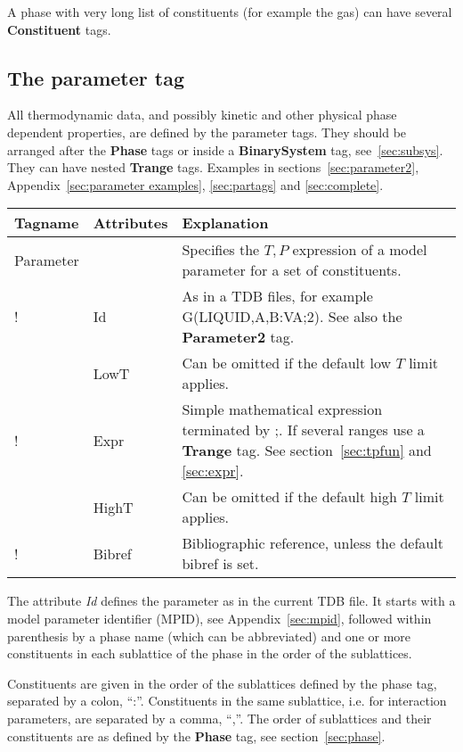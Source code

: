 \documentclass{article}
\begin{document}
A phase with very long list of constituents (for example the gas) can
have several {\bf Constituent} tags.

\subsection{The parameter tag}\label{sec:parametertag}

All thermodynamic data, and possibly kinetic and other physical phase
dependent properties, are defined by the parameter tags.  They should
be arranged after the {\bf Phase} tags or inside a {\bf BinarySystem}
tag, see~\ref{sec:subsys}.  They can have nested {\bf Trange} tags.
Examples in sections~\ref{sec:parameter2}, Appendix~\ref{sec:parameter
  examples}, \ref{sec:partags} and \ref{sec:complete}.

\bigskip
\begin{tabular}{|p{} p{} p{}|}\hline
  Tagname& Attributes & Explanation\\\hline

  Parameter & & Specifies the $T, P$ expression of a model parameter for a set of constituents.\\
!      & Id & As in a TDB files, for example G(LIQUID,A,B:VA;2).  See also the {\bf Parameter2} tag. \\
      & LowT & Can be omitted if the default low $T$ limit applies.\\
!      & Expr & Simple mathematical expression terminated by ;.  If several ranges use a {\bf Trange} tag.  See section~\ref{sec:tpfun} and \ref{sec:expr}.\\
      & HighT & Can be omitted if the default high $T$ limit applies.\\
!      & Bibref & Bibliographic reference, unless the default bibref is set.\\\hline
\end{tabular}

The attribute {\em Id} defines the parameter as in the current TDB
file.  It starts with a model parameter identifier (MPID), see
Appendix~\ref{sec:mpid}, followed within parenthesis by a phase name
(which can be abbreviated) and one or more constituents in each
sublattice of the phase in the order of the sublattices.

Constituents are given in the order of the sublattices defined by the
phase tag, separated by a colon, ``:''.  Constituents in the same
sublattice, i.e.  for interaction parameters, are separated by a
comma, ``,''.  The order of sublattices and their constituents are as
defined by the {\bf Phase} tag, see section~\ref{sec:phase}.
\end{document}
